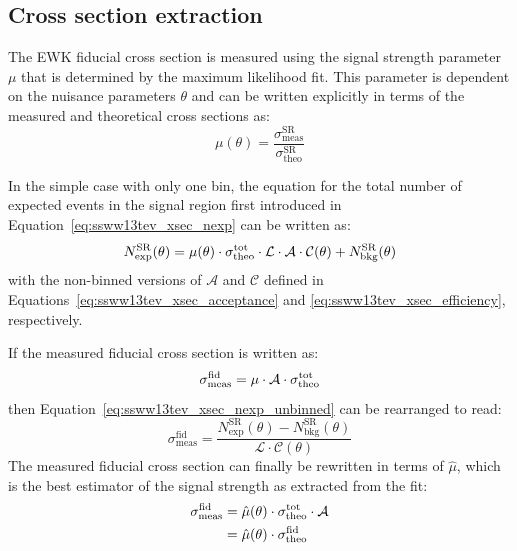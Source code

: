 \subsection{Cross section extraction}\label{ssww13tev:xsec_method}
The \ssww EWK fiducial cross section is measured using the signal strength parameter $\mu$ that is determined by the maximum likelihood fit.
This parameter is dependent on the nuisance parameters $\theta$ and can be written explicitly in terms of the measured and theoretical cross sections as:
\begin{equation}
  \mu(\theta) = \frac{\sigma_{\textrm{meas}}^{\textrm{SR}}}{\sigma_{\textrm{theo}}^{\textrm{SR}}}
  \label{eq:ssww13tev_xsec_mu}
\end{equation}

In the simple case with only one bin, the equation for the total number of expected events in the signal region first introduced in Equation~\ref{eq:ssww13tev_xsec_nexp} can be written as:
\begin{equation}
  N_{\textrm{exp}}^{\textrm{SR}}(\theta) = \mu(\theta)\cdot\sigmatottheo\cdot\mathcal{L}\cdot\mathcal{A}\cdot\mathcal{C}(\theta)+N_{\textrm{bkg}}^{\textrm{SR}}(\theta)
  \label{eq:ssww13tev_xsec_nexp_unbinned}
\end{equation}
with the non-binned versions of $\mathcal{A}$ and $\mathcal{C}$ defined in Equations~\ref{eq:ssww13tev_xsec_acceptance} and \ref{eq:ssww13tev_xsec_efficiency}, respectively.

If the measured fiducial cross section is written as:
\begin{equation}
  \sigma_{\textrm{meas}}^{\textrm{fid}} = \mu\cdot\mathcal{A}\cdot\sigma_{\textrm{theo}}^{\textrm{tot}}
\end{equation}
then Equation~\ref{eq:ssww13tev_xsec_nexp_unbinned} can be rearranged to read:
\begin{equation}
  \sigma_{\textrm{meas}}^{\textrm{fid}} = \frac{N_{\textrm{exp}}^{\textrm{SR}}(\theta)-N_{\textrm{bkg}}^{\textrm{SR}}(\theta)}{\mathcal{L}\cdot\mathcal{C}(\theta)}
  \label{eq:ssww13tev_xsec_fid_meas}
\end{equation}
The measured fiducial cross section can finally be rewritten in terms of $\hat{\mu}$, which is the best estimator of the signal strength as extracted from the fit:
\begin{equation}
  \begin{aligned}
    \sigma_{\textrm{meas}}^{\textrm{fid}} &= \hat{\mu}(\theta)\cdot\sigmatottheo\cdot\mathcal{A}\\
    &= \hat{\mu}(\theta)\cdot\sigma_{\textrm{theo}}^{\textrm{fid}}
  \end{aligned}
  \label{eq:ssww13tev_xsec_fid_meas_mu}
\end{equation}

